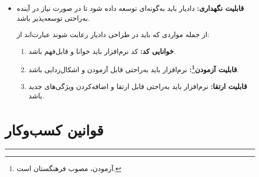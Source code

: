 \documentclass[12pt,a4paper,oneside]{article}
\begin{document}
\begin{itemize}
				از مواردی که باید در طراحی سامانه دادیار رعایت شوند عبارت‌اند از:
				\begin{enumerate}
					\item 
					\textbf{سهولت یادگیری:}
					سامانه دادیار باید به‌راحتی قابل‌یادگیری و استفاده باشد.
					
					\item
					\textbf{رابط کاربری:}
					\hyperref[ref:gui]{\textbf{رابط کاربری}}
					 دادیار باید بصری و 
					\hyperref[ref:userfriendly]{\textbf{کاربرپسند}}
					 باشد.
					
					\item
					\textbf{سازگاری:}
					 سامانه دادیار باید با 
					 \hyperref[ref:os]{\textbf{سیستم‌عامل‌ها}}
و \hyperref[ref:browser]{\textbf{مرورگرهای}} 
مختلف سازگار باشد. همچنین این سامانه باید به‌صورت 
					  \hyperref[ref:responsivedesign]{\textbf{واکنش‌گرا}}\footnote{\hyperref[ref:responsivedesign]{\textbf{}}}
 طراحی شود تا با دستگاه‌های متفاوت با اندازه صفحه‌های رایج سازگار باشد.
				\end{enumerate}
				
				\item 
				\textbf{قابلیت نگهداری:}
				دادیار باید به‌گونه‌ای توسعه داده شود تا در صورت نیاز در آینده به‌راحتی توسعه‌پذیر باشد.
				
				از جمله مواردی که باید در طراحی دادیار رعایت شوند عبارت‌اند از:
				\begin{enumerate}
					\item 
					\textbf{خوانایی کد:}
					کد نرم‌افزار باید خوانا و قابل‌فهم باشد.
					
					\item 
					\textbf{قابلیت آزمودن\footnote{آزمودن، مصوب فرهنگستان  است.}:}
					نرم‌افزار باید به‌راحتی قابل آزمودن و اشکال‌زدایی باشد.
					
					\item 
					\textbf{قابلیت ارتقا:}
					نرم‌افزار باید به‌راحتی قابل ارتقا و اضافه‌کردن ویژگی‌های جدید باشد.
				\end{enumerate}
			\end{itemize}

	\newpage

	\section{قوانین کسب‌وکار}
\vspace{-2em} 
\par\noindent\rule{\textwidth}{0.72pt}
\end{document}
